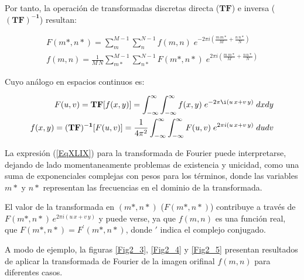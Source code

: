 Por tanto, la operaci\'on de transformadas discretas directa ($\mathbf{TF}$) e inversa ($\mathbf{(TF)^{-1}}$) resultan:

\begin{eqnarray}
	F(m*, n*) = \sum _{m} ^{M-1} \sum _{n} ^{N-1} f(m, n) \; e^{-2 \pi i \left( \frac{m \, m*}{M} + \frac{n \, n*}{N}\right)} \nonumber \\
	f(m, n) = \frac{1}{M \, N} \sum _{m*} ^{M-1} \sum _{n*} ^{N-1} F(m*, n*) \; e^{2 \pi i \left( \frac{m \, m*}{M} + \frac{n \, n*}{N}\right)}
\label{EqXLVIII}
\end{eqnarray}

Cuyo an\'alogo en espacios continuos es:

\begin{eqnarray}
	F(u, v) = \mathbf{TF}[f(x, y)] = \int_{-\infty}^{\infty} \int_{-\infty}^{\infty} f(x, y) \; e^{-2 \pi \i (u \, x + v \, y)} \; dx dy \nonumber \\
	f(x, y) = \mathbf{(TF)^{-1}}[F(u, v)] = \frac{1}{4 \pi^{2}} \int_{-\infty}^{\infty} \int_{-\infty}^{\infty} F(u, v) \; 
	e^{2 \pi i (u \, x + v \, y)} \; du dv
\label{EqLI}
\end{eqnarray}



La expresi\'on (\ref{EqXLIX}) para la transformada de Fourier puede interpretarse, dejando de lado momentaneamente problemas de existencia y unicidad, como
una suma de exponenciales complejas con pesos para los t\'erminos, donde las variables $m*$ y $n*$ representan las frecuencias en el dominio de la 
transformada.
%

%
El valor de la transformada en $(m*, n*)$ ($F(m*, n*)$) contribuye a trav\'es de $F(m*, n*) \, e^{2 \pi i (u \, x + v \, y)}$ y puede verse, ya que $f(m, n)$
es una funci\'on real, que $F(m*, n*) = F^{\prime} (m*, n*)$, donde $\prime$ indica el complejo conjugado.
%

%
A modo de ejemplo, la figuras \ref{Fig2_3}, \ref{Fig2_4} y  \ref{Fig2_5} presentan resultados de aplicar la transformada de Fourier de la imagen 
orifinal $f(m, n)$ para diferentes casos.

\vspace{1.0cm}

